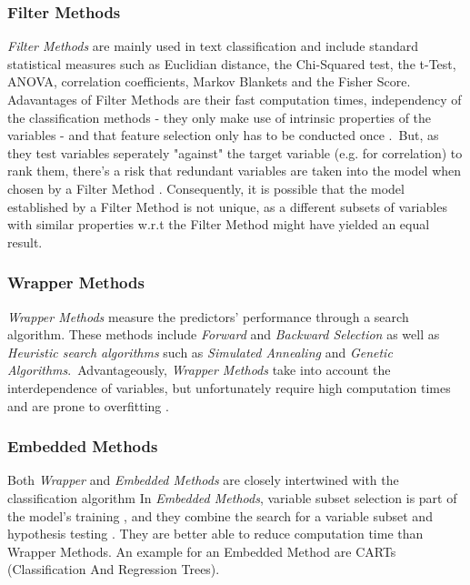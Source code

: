 \documentclass[a4paper, 11pt]{article}
\begin{document}
\subsubsection{Filter Methods}
\textit{Filter Methods} are mainly used in text classification and include standard statistical measures such as Euclidian distance, the Chi-Squared test, the t-Test, ANOVA, correlation coefficients, Markov Blankets
and the Fisher Score. 
Adavantages of Filter Methods are their fast computation times, independency of the classification methods - they only make use of intrinsic properties of the variables - and that feature selection only has to be conducted once \citep{Saeys.2007}.\
But, as they test variables seperately "against" the target variable (e.g. for correlation) to rank them, there's a risk that redundant variables are taken into the model when chosen by a Filter Method \citep{Chandrashekar.2014}. Consequently, it is possible that the model established by a Filter Method is not unique, as a different subsets of variables with similar properties w.r.t the Filter Method might have yielded an equal result.\

\subsubsection{Wrapper Methods}
\textit{Wrapper Methods} measure the predictors' performance through a search algorithm. These methods include \textit{Forward} and \textit{Backward Selection} as well as \textit{Heuristic search algorithms} such as \textit{Simulated Annealing} and \textit{Genetic Algorithms}.\
Advantageously, \textit{Wrapper Methods} take into account the interdependence of variables, but unfortunately require high computation times and are prone to overfitting \citep{Saeys.2007}.\


\subsubsection{Embedded Methods}              
Both \textit{Wrapper} and \textit{Embedded Methods} are closely intertwined with the classification algorithm \citep{Saeys.2007}
In \textit{Embedded Methods}, variable subset selection is part of the model's training \citep{Chandrashekar.2014}, and they combine the search for a variable subset and hypothesis testing \citep{Saeys.2007}. They are better able to reduce computation time than Wrapper Methods. An example for an Embedded Method are CARTs (Classification And Regression Trees).
\\
\end{document}
